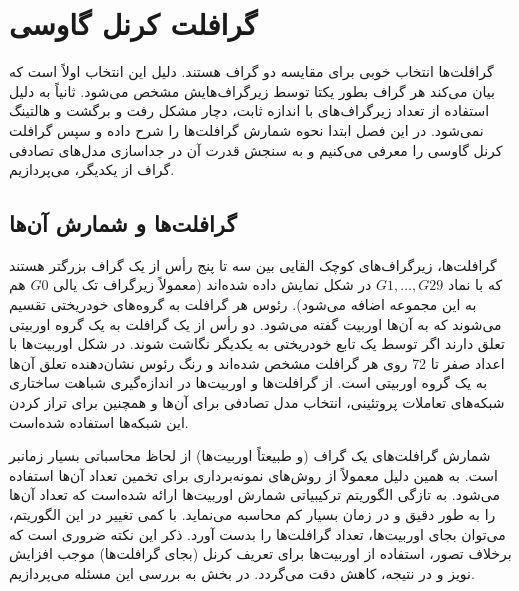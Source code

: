 \chapter{گرافلت کرنل گاوسی}\label{chap:gaussian-graphlet-kernel}
گرافلت‌ها انتخاب خوبی برای مقایسه دو گراف هستند. دلیل این انتخاب اولاً  است که بیان می‌کند هر گراف بطور یکتا توسط زیرگراف‌هایش مشخص می‌شود. ثانیاً به دلیل استفاده از تعداد زیرگراف‌های با اندازه ثابت، دچار مشکل رفت و برگشت و هالتینگ نمی‌شود.
در این فصل ابتدا نحوه شمارش گرافلت‌ها را شرح داده و سپس گرافلت کرنل گاوسی را معرفی می‌کنیم و به سنجش قدرت آن در جداسازی مدل‌های تصادفی گراف از یکدیگر، می‌پردازیم.

\section{گرافلت‌ها و شمارش آن‌ها}
گرافلت‌ها، زیرگراف‌های کوچک القایی بین سه تا پنج رأس از یک گراف بزرگتر هستند که با نماد $G1,\ldots,G29$ در شکل  نمایش داده شده‌اند (معمولاً زیرگراف تک یالی $G0$ هم به این مجموعه اضافه می‌شود).  رئوس هر گرافلت به گروه‌های خودریختی تقسیم می‌شوند که به آن‌ها اوربیت گفته می‌شود. دو رأس از یک گرافلت به یک گروه اوربیتی تعلق دارند اگر توسط یک تابع خودریختی به یکدیگر نگاشت شوند. در شکل  اوربیت‌ها با اعداد صفر تا 72 روی هر گرافلت مشخص شده‌اند و رنگ رئوس نشان‌دهنده تعلق آن‌ها به یک گروه اوربیتی است. از گرافلت‌ها و اوربیت‌ها در اندازه‌گیری شباهت ساختاری شبکه‌های تعاملات پروتئینی، انتخاب مدل تصادفی برای آن‌ها و همچنین برای تراز کردن این شبکه‌ها استفاده شده‌است.

شمارش گرافلت‌های یک گراف (و طبیعتاً اوربیت‌ها) از لحاظ محاسباتی بسیار زمانبر است. به همین دلیل معمولاً از روش‌های نمونه‌برداری برای تخمین تعداد آن‌ها استفاده می‌شود. به تازگی الگوریتم ترکیبیاتی شمارش اوربیت‌ها ارائه شده‌است که تعداد آن‌ها را به طور دقیق و در زمان بسیار کم محاسبه می‌نماید. با کمی تغییر در این الگوریتم، می‌توان بجای اوربیت‌ها، تعداد گرافلت‌ها را بدست آورد. ذکر این نکته ضروری است که برخلاف تصور، استفاده از اوربیت‌ها برای تعریف کرنل (بجای گرافلت‌ها) موجب افزایش نویز و در نتیجه، کاهش دقت می‌گردد. در بخش  به بررسی این مسئله می‌پردازیم.

